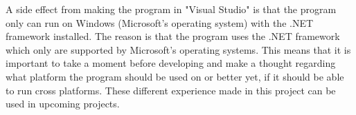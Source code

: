 A side effect from making the program in "Visual Studio" is that the program only can run on Windows (Microsoft's operating system) with the .NET framework installed. The reason is that the program uses the .NET framework which only are supported by Microsoft's operating systems.
This means that it is important to take a moment before developing and make a thought regarding what platform the program should be used on or better yet, if it should be able to run cross platforms.
These different experience made in this project can be used in upcoming projects.